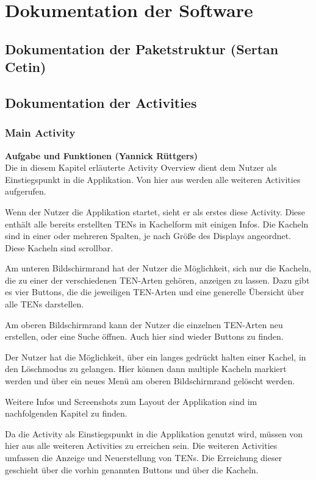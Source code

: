\section{Dokumentation der Software}
\label{instal}

\subsection{Dokumentation der Paketstruktur (Sertan Cetin)}
 
\subsection{Dokumentation der Activities}

\subsubsection{Main Activity}
\textbf{Aufgabe und Funktionen (Yannick Rüttgers)}\\
Die in diesem Kapitel erläuterte Activity Overview dient dem Nutzer als Einstiegspunkt in die Applikation. Von hier aus werden alle weiteren Activities aufgerufen.

Wenn der Nutzer die Applikation startet, sieht er als erstes diese Activity. Diese enthält alle bereits erstellten TENs in Kachelform mit einigen Infos. Die Kacheln sind in einer oder mehreren Spalten, je nach Größe des Displays angeordnet. Diese Kacheln sind scrollbar.

Am unteren Bildschirmrand hat der Nutzer die Möglichkeit, sich nur die Kacheln, die zu einer der verschiedenen TEN-Arten gehören, anzeigen zu lassen. Dazu gibt es vier Buttons, die die jeweiligen TEN-Arten und eine generelle Übersicht über alle TENs darstellen.

Am oberen Bildschirmrand kann der Nutzer die einzelnen TEN-Arten neu erstellen, oder eine Suche öffnen. Auch hier sind wieder Buttons zu finden.

Der Nutzer hat die Möglichkeit, über ein langes gedrückt halten einer Kachel, in den Löschmodus zu gelangen. Hier können dann multiple Kacheln markiert werden und über ein neues Menü am oberen Bildschirmrand gelöscht werden.

Weitere Infos und Screenshots zum Layout der Applikation sind im nachfolgenden Kapitel zu finden.

Da die Activity als Einstiegspunkt in die Applikation genutzt wird, müssen von hier aus alle weiteren Activities zu erreichen sein. Die weiteren Activities umfassen die Anzeige und Neuerstellung von TENs. Die Erreichung dieser geschieht über die vorhin genannten Buttons und über die Kacheln.

